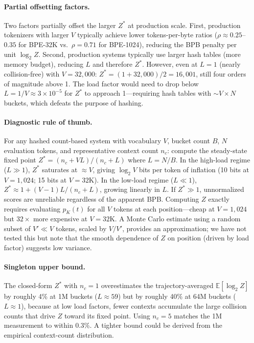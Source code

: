 \documentclass[11pt]{article}
\newcommand{\E}{\mathbb{E}}
\begin{document}
\paragraph{Partial offsetting factors.} Two factors partially offset the larger $Z^*$ at production scale. First, production tokenizers with larger $V$ typically achieve lower tokens-per-byte ratios ($\rho \approx 0.25$--$0.35$ for BPE-32K vs.\ $\rho = 0.71$ for BPE-1024), reducing the BPB penalty per unit $\log_2 Z$. Second, production systems typically use larger hash tables (more memory budget), reducing $L$ and therefore $Z^*$. However, even at $L = 1$ (nearly collision-free) with $V = 32{,}000$: $Z^* = (1 + 32{,}000)/2 = 16{,}001$, still four orders of magnitude above 1. The load factor would need to drop below $L = 1/V \approx 3 \times 10^{-5}$ for $Z^*$ to approach 1---requiring hash tables with ${\sim}V \times N$ buckets, which defeats the purpose of hashing.

\paragraph{Diagnostic rule of thumb.} For any hashed count-based system with vocabulary $V$, bucket count $B$, $N$ evaluation tokens, and representative context count $n_c$: compute the steady-state fixed point $Z^* = (n_c + VL)/(n_c + L)$ where $L = N/B$. In the high-load regime ($L \gg 1$), $Z^*$ saturates at ${\approx}V$, giving $\log_2 V$ bits per token of inflation (10 bits at $V = 1{,}024$; 15 bits at $V = 32\text{K}$). In the low-load regime ($L \ll 1$), $Z^* \approx 1 + (V-1)L/(n_c + L)$, growing linearly in $L$. If $Z^* \gg 1$, unnormalized scores are unreliable regardless of the apparent BPB. Computing $Z$ exactly requires evaluating $p_K(t)$ for all $V$ tokens at each position---cheap at $V = 1{,}024$ but $32\times$ more expensive at $V = 32$K. A Monte Carlo estimate using a random subset of $V' \ll V$ tokens, scaled by $V/V'$, provides an approximation; we have not tested this but note that the smooth dependence of $Z$ on position (driven by load factor) suggests low variance.

\paragraph{Singleton upper bound.} The closed-form $Z^*$ with $n_c = 1$ overestimates the trajectory-averaged $\E[\log_2 Z]$ by roughly 4\% at 1M buckets ($L \approx 59$) but by roughly 40\% at 64M buckets ($L \approx 1$), because at low load factors, fewer contexts accumulate the large collision counts that drive $Z$ toward its fixed point. Using $n_c = 5$ matches the 1M measurement to within 0.3\%. A tighter bound could be derived from the empirical context-count distribution.
\end{document}
